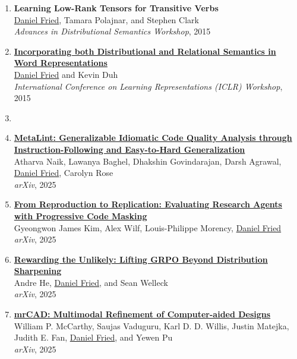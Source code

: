 \begin{enumerate}[leftmargin=-1mm,partopsep=0pt]
\item \textbf{Learning Low-Rank Tensors for Transitive Verbs} \\
  \underline{Daniel Fried}, Tamara Polajnar, and Stephen Clark\\
  \emph{Advances in Distributional Semantics Workshop}, 2015

\item \href{http://arxiv.org/abs/1412.5836}{\textbf{Incorporating both Distributional and Relational Semantics in Word Representations}} \\
  \underline{Daniel Fried} and Kevin Duh\\
  \emph{International Conference on Learning Representations (ICLR) Workshop}, 2015

\item[]

\item \href{https://arxiv.org/abs/2507.11687}{\textbf{MetaLint: Generalizable Idiomatic Code Quality Analysis through Instruction-Following and Easy-to-Hard Generalization}} \\
  Atharva Naik, Lawanya Baghel, Dhakshin Govindarajan, Darsh Agrawal, \underline{Daniel Fried}, Carolyn Rose\\
  \emph{arXiv}, 2025

\item \href{https://arxiv.org/abs/2506.19724}{\textbf{From Reproduction to Replication: Evaluating Research Agents with Progressive Code Masking}} \\
  Gyeongwon James Kim, Alex Wilf, Louis-Philippe Morency, \underline{Daniel Fried}\\
  \emph{arXiv}, 2025

\item \href{https://arxiv.org/abs/2506.02355}{\textbf{Rewarding the Unlikely: Lifting GRPO Beyond Distribution Sharpening}} \\
  Andre He, \underline{Daniel Fried}, and Sean Welleck\\
  \emph{arXiv}, 2025

\item \href{https://arxiv.org/abs/2504.20294}{\textbf{mrCAD: Multimodal Refinement of Computer-aided Designs}} \\
  William P. McCarthy, Saujas Vaduguru, Karl D. D. Willis, Justin Matejka, Judith E. Fan, \underline{Daniel Fried}, and Yewen Pu\\
  \emph{arXiv}, 2025


\end{enumerate}
